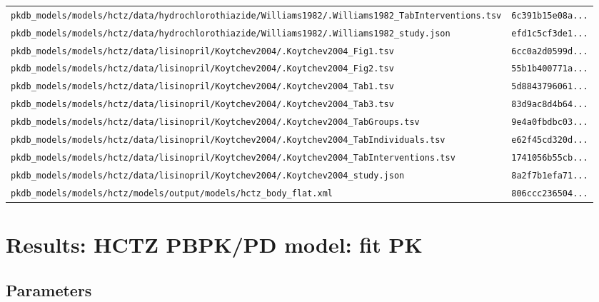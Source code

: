 \documentclass{article}
\begin{document}
\begin{longtable}{ll}
\texttt{pkdb\_models/models/hctz/data/hydrochlorothiazide/Williams1982/.Williams1982\_TabInterventions.tsv} & \texttt{6c391b15e08a...} \\
\texttt{pkdb\_models/models/hctz/data/hydrochlorothiazide/Williams1982/.Williams1982\_study.json} & \texttt{efd1c5cf3de1...} \\
\texttt{pkdb\_models/models/hctz/data/lisinopril/Koytchev2004/.Koytchev2004\_Fig1.tsv} & \texttt{6cc0a2d0599d...} \\
\texttt{pkdb\_models/models/hctz/data/lisinopril/Koytchev2004/.Koytchev2004\_Fig2.tsv} & \texttt{55b1b400771a...} \\
\texttt{pkdb\_models/models/hctz/data/lisinopril/Koytchev2004/.Koytchev2004\_Tab1.tsv} & \texttt{5d8843796061...} \\
\texttt{pkdb\_models/models/hctz/data/lisinopril/Koytchev2004/.Koytchev2004\_Tab3.tsv} & \texttt{83d9ac8d4b64...} \\
\texttt{pkdb\_models/models/hctz/data/lisinopril/Koytchev2004/.Koytchev2004\_TabGroups.tsv} & \texttt{9e4a0fbdbc03...} \\
\texttt{pkdb\_models/models/hctz/data/lisinopril/Koytchev2004/.Koytchev2004\_TabIndividuals.tsv} & \texttt{e62f45cd320d...} \\
\texttt{pkdb\_models/models/hctz/data/lisinopril/Koytchev2004/.Koytchev2004\_TabInterventions.tsv} & \texttt{1741056b55cb...} \\
\texttt{pkdb\_models/models/hctz/data/lisinopril/Koytchev2004/.Koytchev2004\_study.json} & \texttt{8a2f7b1efa71...} \\
\texttt{pkdb\_models/models/hctz/models/output/models/hctz\_body\_flat.xml} & \texttt{806ccc236504...} \\
\end{longtable}

\section{Results: HCTZ PBPK/PD model: fit PK}

\subsection{Parameters}
\end{document}
